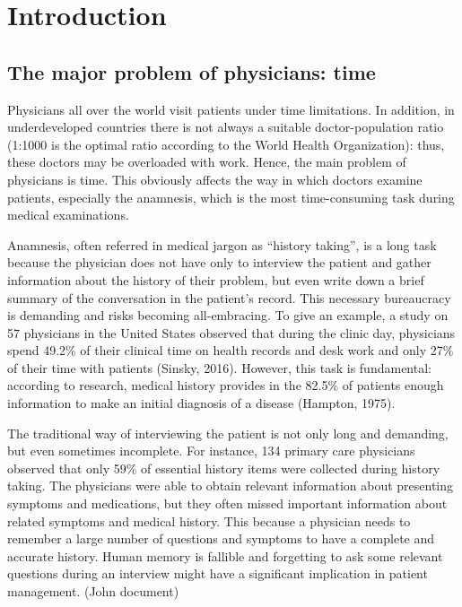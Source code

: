 \chapter{Introduction}
\label{cha:intro}

\section{The major problem of physicians: time}
\label{sec:problem_doctors}

Physicians all over the world visit patients under time limitations. In addition, in underdeveloped countries there is not always a suitable doctor-population ratio (1:1000 is the optimal ratio according to the World Health Organization): thus, these doctors may be overloaded with work. Hence, the main problem of physicians is time. This obviously affects the way in which doctors examine patients, especially the anamnesis, which is the most time-consuming task during medical examinations.

Anamnesis, often referred in medical jargon as “history taking”, is a long task because the physician does not have only to interview the patient and gather information about the history of their problem, but even write down a brief summary of the conversation in the patient’s record. This necessary bureaucracy is demanding and risks becoming all-embracing. To give an example, a study on 57 physicians in the United States observed that during the clinic day, physicians spend 49.2\% of their clinical time on health records and desk work and only 27\% of their time with patients (Sinsky, 2016). However, this task is fundamental: according to research, medical history provides in the 82.5\% of patients enough information to make an initial diagnosis of a disease (Hampton, 1975).

The traditional way of interviewing the patient is not only long and demanding, but even sometimes incomplete. For instance, 134 primary care physicians observed that only 59\% of essential history items were collected during history taking. The physicians were able to obtain relevant information about presenting symptoms and medications, but they often missed important information about related symptoms and medical history. This because a physician needs to remember a large number of questions and symptoms to have a complete and accurate history. Human memory is fallible and forgetting to ask some relevant questions during an interview might have a significant implication in patient management. (John document)

